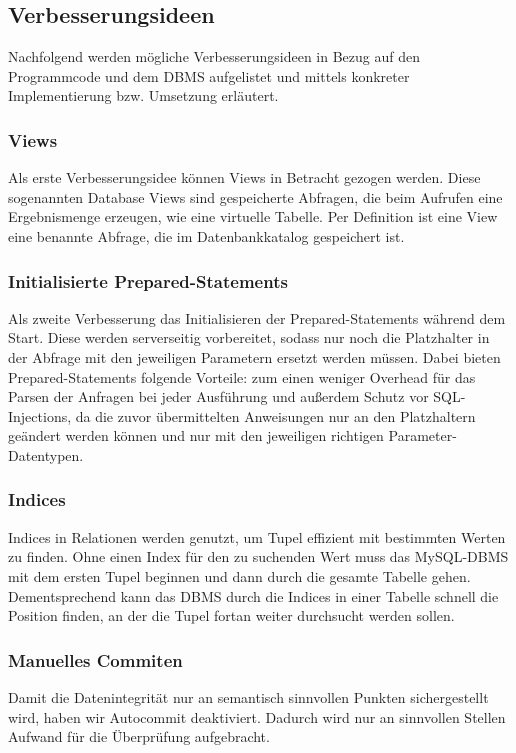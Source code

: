 \subsection{Verbesserungsideen}\label{subsec:verbesserungsideen}
Nachfolgend werden mögliche Verbesserungsideen in Bezug auf den Programmcode und dem DBMS aufgelistet und mittels konkreter Implementierung bzw. Umsetzung erläutert.
\subsubsection{Views}
Als erste Verbesserungsidee können Views in Betracht gezogen werden.
Diese sogenannten Database Views sind gespeicherte Abfragen, die beim Aufrufen eine Ergebnismenge erzeugen, wie eine virtuelle Tabelle.
Per Definition ist eine View eine benannte Abfrage, die im Datenbankkatalog gespeichert ist.

\subsubsection{Initialisierte Prepared-Statements}
Als zweite Verbesserung das Initialisieren der Prepared-Statements während dem Start.
Diese werden serverseitig vorbereitet, sodass nur noch die Platzhalter in der Abfrage mit den jeweiligen Parametern ersetzt werden müssen.
Dabei bieten Prepared-Statements folgende Vorteile: zum einen weniger Overhead für das Parsen der Anfragen bei jeder Ausführung und außerdem Schutz vor SQL-Injections, da die zuvor übermittelten Anweisungen nur an den Platzhaltern geändert werden können und nur mit den jeweiligen richtigen Parameter-Datentypen.
\subsubsection{Indices}
Indices in Relationen werden genutzt, um Tupel effizient mit bestimmten Werten zu finden.
Ohne einen Index für den zu suchenden Wert muss das MySQL-DBMS mit dem ersten Tupel beginnen und dann durch die gesamte Tabelle gehen.
Dementsprechend kann das DBMS durch die Indices in einer Tabelle schnell die Position finden, an der die Tupel fortan weiter durchsucht werden sollen.

\subsubsection{Manuelles Commiten}
Damit die Datenintegrität nur an semantisch sinnvollen Punkten sichergestellt wird, haben wir Autocommit deaktiviert.
Dadurch wird nur an sinnvollen Stellen Aufwand für die Überprüfung aufgebracht.

